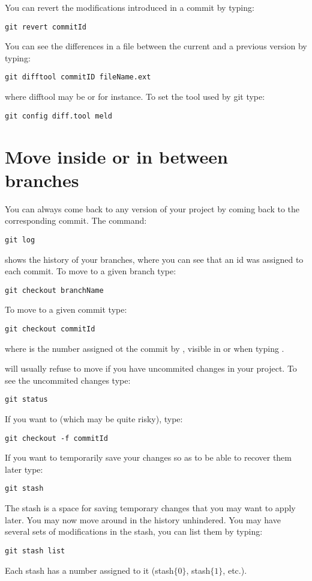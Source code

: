 You can revert the modifications introduced in a commit by typing:
\begin{lstlisting}
git revert commitId
\end{lstlisting}

You can see the differences in a file between the current and a previous version by typing:
\begin{lstlisting}
git difftool commitID fileName.ext
\end{lstlisting}
where difftool may be  or  for instance.
To set the tool used by git type:
\begin{lstlisting}
git config diff.tool meld
\end{lstlisting}


\section{Move inside or in between branches}

You can always come back to any version of your project by coming back to the corresponding commit.
The command:
\begin{lstlisting}
git log
\end{lstlisting}
shows the history of your branches, where you can see that an id was assigned to each commit.
To move to a given branch type:
\begin{lstlisting}
git checkout branchName
\end{lstlisting}
To move to a given commit type:
\begin{lstlisting}
git checkout commitId
\end{lstlisting}
where  is the number assigned ot the commit by , visible in  or when typing .

 will usually refuse to move if you have uncommited changes in your project.
To see the uncommited changes type:
\begin{lstlisting}
git status
\end{lstlisting}
If you want to  (which may be quite risky), type:
\begin{lstlisting}
git checkout -f commitId
\end{lstlisting}
If you want to temporarily save your changes so as to be able to recover them later type:
\begin{lstlisting}
git stash
\end{lstlisting}
The stash is a space for saving temporary changes that you may want to apply later.
You may now move around in the history unhindered.
You may have several sets of modifications in the stash, you can list them by typing:
\begin{lstlisting}
git stash list
\end{lstlisting}
Each stash has a number assigned to it (stash$\{0\}$, stash$\{1\}$, etc.).


